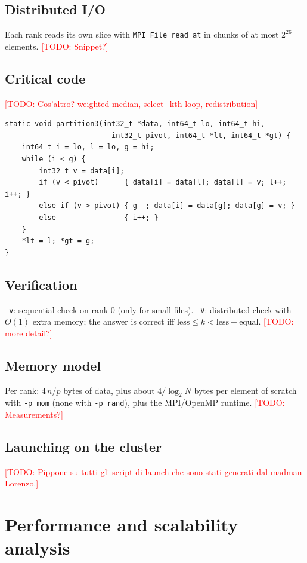 \documentclass[11pt, titlepage]{article}
\newcommand{\TODO}[1]{\textcolor{red}{[TODO: #1]}}
\begin{document}
\subsection{Distributed I/O}
Each rank reads its own slice with \texttt{MPI\_File\_read\_at} in chunks of at most $2^{26}$ elements. \TODO{Snippet?}

\subsection{Critical code}
\TODO{Cos'altro? weighted median, select\_kth loop, redistribution}
\begin{lstlisting}[caption={Three way (Dutch national flag) partition.}]
static void partition3(int32_t *data, int64_t lo, int64_t hi,
                         int32_t pivot, int64_t *lt, int64_t *gt) {
    int64_t i = lo, l = lo, g = hi;
    while (i < g) {
        int32_t v = data[i];
        if (v < pivot)      { data[i] = data[l]; data[l] = v; l++; i++; }
        else if (v > pivot) { g--; data[i] = data[g]; data[g] = v; }
        else                { i++; }
    }
    *lt = l; *gt = g;  
}
\end{lstlisting}

\subsection{Verification}
\texttt{-v}: sequential check on rank-0 (only for small files).
\texttt{-V}: distributed check with $O(1)$ extra memory; the answer is correct iff $\mathrm{less}\le k<\mathrm{less}+\mathrm{equal}$. \TODO{more detail?}

\subsection{Memory model}
Per rank: $4\,n/p$ bytes of data, plus about $4/\log_2 N$ bytes per element of scratch with \texttt{-p mom} (none with \texttt{-p rand}), plus the MPI/OpenMP runtime. \TODO{Measurements?}

\subsection{Launching on the cluster}
\TODO{Pippone su tutti gli script di launch che sono stati generati dal madman Lorenzo.}

\section{Performance and scalability analysis}\label{sec:perf}
\end{document}
